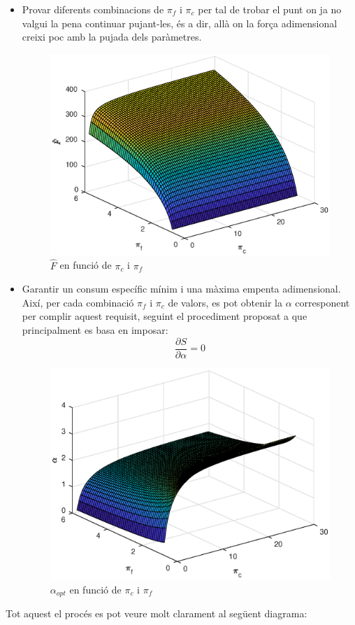 \begin{itemize}
\item Provar diferents combinacions de $\pi_f$ i $\pi_c$ per tal de trobar el punt on ja no valgui la pena continuar pujant-les, és a dir, allà on la força adimensional creixi poc amb la pujada dels paràmetres.
\begin{figure}[H]
	\centering
	\includegraphics[scale=0.6]{./pics/F_pc_pf}
	\caption{\(\hat{F}\) en funció de $\pi_c$ i $\pi_f$}
\end{figure}
\item Garantir un consum específic mínim i una màxima empenta adimensional. Així, per cada combinació  $\pi_f$ i $\pi_c$ de valors, es pot obtenir la $\alpha$ corresponent per complir aquest requisit, seguint el procediment proposat a \cite[5-10]{mattingly} que principalment es basa en imposar:
\begin{equation*}
	\frac{\partial S}{\partial \alpha} = 0 
\end{equation*}
\begin{figure}[H]
	\centering
	\includegraphics[scale=0.6]{./pics/alpha_pc_pf}
	\caption{$\alpha_{opt}$ en funció de $\pi_c$ i $\pi_f$}
\end{figure}
\end{itemize}
Tot aquest el procés es pot veure molt clarament al següent diagrama:

